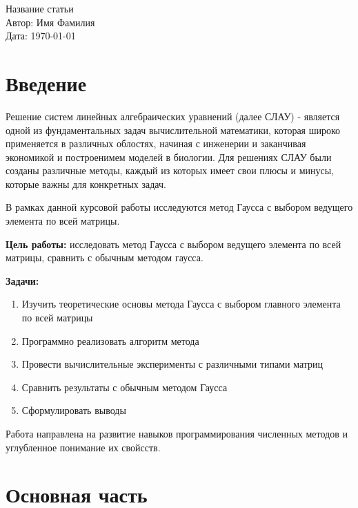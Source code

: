 \documentclass[a4paper,12pt]{article}
\begin{document}
	
	\begin{center}
		{\LARGE Название статьи} \\[1cm]
		{\large Автор: Имя Фамилия} \\[0.5cm]
		{\large Дата: \today}
	\end{center}
	
	\newpage
	
	
	\tableofcontents*
	
	\newpage
	\setcounter{page}{3}
	\section{Введение}
	Решение систем линейных алгебраических уравнений (далее СЛАУ) - является одной из фундаментальных задач вычислительной математики, которая широко применяется в различных облостях, начиная с инженерии и заканчивая экономикой и построенимем моделей в биологии. Для решениях СЛАУ были созданы различные методы, каждый из которых имеет свои плюсы и минусы, которые важны для конкретных задач.
	
	В рамках данной курсовой работы исследуются метод Гаусса с выбором ведущего элемента по всей матрицы.
	
	\textbf{Цель работы:} исследовать метод Гаусса с выбором ведущего элемента по всей матрицы, сравнить с обычным методом гаусса.
	
	\textbf{Задачи:}
	\begin{enumerate}
		\item Изучить теоретические основы метода Гаусса с выбором главного элемента по всей матрицы
		
		\item Программно реализовать алгоритм метода
		
		\item Провести вычислительные эксперименты с различными типами матриц
		
		\item Сравнить результаты с обычным методом Гаусса
		
		\item Сформулировать выводы
	\end{enumerate}
	
	Работа направлена на развитие навыков программирования численных методов и углубленное понимание их свойсств.
	
	\section{Основная часть}
\end{document}

